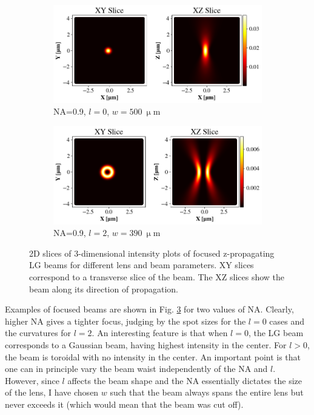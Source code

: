 \begin{figure}
    \begin{subfigure}[b]{0.49\textwidth}
        \includegraphics[width=\textwidth]{Figures/Efoc_NA9_l0.png}
        \caption{NA=0.9, \( l=0 \), \( w=500\ \mathrm{\upmu m} \)}
        \label{fig:c}
    \end{subfigure}
    \begin{subfigure}[b]{0.49\textwidth}
        \includegraphics[width=\textwidth]{Figures/Efoc_NA9_l2.png}
        \caption{NA=0.9, \( l=2 \), \( w=390\ \mathrm{\upmu m} \)}
        \label{fig:d}
    \end{subfigure}

    \caption{2D slices of 3-dimensional intensity plots of focused z-propagating LG beams for different lens and beam parameters. XY slices correspond to a transverse slice of the beam. The XZ slices show the beam along its direction of propagation.}
    \label{fig:Efoc}
\end{figure}

Examples of focused beams are shown in Fig. \ref{fig:Efoc} for two values of NA. Clearly, higher NA gives a tighter focus, judging by the spot sizes for the \( l=0 \) cases and the curvatures for \( l=2 \). 
An interesting feature is that when \( l=0 \), the LG beam corresponds to a Gaussian beam, having highest intensity in the center. For \( l > 0 \), the beam is toroidal with no intensity in the center. 
An important point is that one can in principle vary the beam waist independently of the NA and \( l \). However, since \( l \) affects the beam shape and the NA essentially dictates the size of the lens, I have chosen \( w \) such that the beam always spans the entire lens but never exceeds it (which would mean that the beam was cut off).

